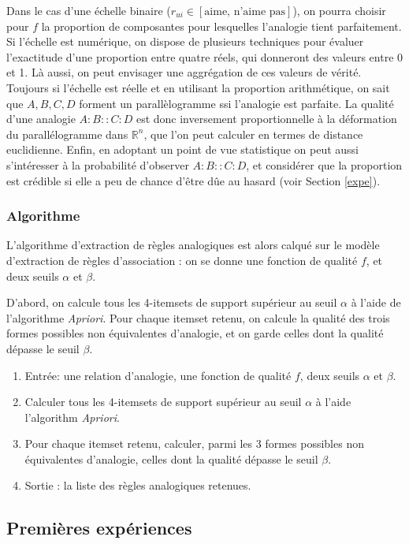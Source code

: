 Dans le cas d'une échelle binaire ($r_{ui} \in [\text{aime, n'aime pas}]$), on
pourra choisir pour $f$ la proportion de composantes pour lesquelles l'analogie
tient parfaitement.  Si l'échelle est numérique, on dispose de plusieurs
techniques pour évaluer l'exactitude d'une proportion entre quatre réels, qui
donneront des valeurs entre 0 et 1. Là aussi, on peut envisager une
aggrégation de ces valeurs de vérité.  Toujours si l'échelle est réelle et en
utilisant la proportion arithmétique, on sait que $A, B, C, D$ forment un
parallèlogramme ssi l'analogie est parfaite. La qualité d'une analogie
$A:B::C:D$ est donc inversement proportionnelle à la déformation du
parallélogramme dans $\mathbb{R}^n$, que l'on peut calculer en termes de
distance euclidienne.  Enfin, en adoptant un point de vue statistique on peut aussi
s'intéresser à la probabilité d'observer $A:B::C:D$, et considérer que la
proportion est crédible si elle a peu de chance d'être dûe au hasard (voir
Section \ref{expe}).

\subsubsection{Algorithme}
L'algorithme d'extraction de règles analogiques est alors calqué sur le modèle
d'extraction de règles d'association : on se donne une fonction de qualité $f$,
et deux seuils $\alpha$ et $\beta$.

D'abord, on calcule tous les 4-itemsets de support supérieur au seuil $\alpha$
à   l'aide de l'algorithme \textit{Apriori}.  Pour chaque itemset retenu,
on calcule la qualité des trois formes possibles non équivalentes d'analogie, et on garde celles dont
la qualité dépasse le seuil $\beta$.

\begin{enumerate}
\item Entrée: une relation d'analogie, une fonction de qualité $f$, deux seuils
  $\alpha$ et $\beta$.
\item Calculer tous les 4-itemsets de support supérieur au seuil $\alpha$ à
  l'aide l'algorithm \textit{Apriori}.
\item Pour chaque itemset retenu, calculer, parmi les 3 formes possibles non
  équivalentes d'analogie, celles dont la qualité dépasse le seuil $\beta$.
\item Sortie : la liste des règles analogiques retenues.
\end{enumerate}

\subsection{Premières expériences}

